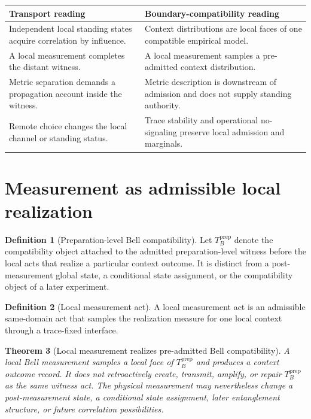\documentclass[11pt]{article}
\newtheorem{theorem}{Theorem}[section]
\theoremstyle{definition}
\newtheorem{definition}[theorem]{Definition}
\newcommand{\TBprep}{T_{B}^{\mathrm{prep}}}
\begin{document}
\begin{center}
\footnotesize
\begin{tabularx}{0.95\textwidth}{Y Y}
\toprule
\textbf{Transport reading} & \textbf{Boundary-compatibility reading}\\
\midrule
Independent local standing states acquire correlation by influence. & Context distributions are local faces of one compatible empirical model.\\
A local measurement completes the distant witness. & A local measurement samples a pre-admitted context distribution.\\
Metric separation demands a propagation account inside the witness. & Metric description is downstream of admission and does not supply standing authority.\\
Remote choice changes the local channel or standing status. & Trace stability and operational no-signaling preserve local admission and marginals.\\
\bottomrule
\end{tabularx}
\end{center}

\section{Measurement as admissible local realization}\label{sec:measurement}

\begin{definition}[Preparation-level Bell compatibility]\label{def:prepcompat}
Let $\TBprep$ denote the compatibility object attached to the admitted preparation-level witness before the local acts that realize a particular context outcome. It is distinct from a post-measurement global state, a conditional state assignment, or the compatibility object of a later experiment.
\end{definition}

\begin{definition}[Local measurement act]
A local measurement act is an admissible same-domain act that samples the realization measure for one local context through a trace-fixed interface.
\end{definition}

\begin{theorem}[Local measurement realizes pre-admitted Bell compatibility]\label{thm:localmeasurement}
A local Bell measurement samples a local face of $\TBprep$ and produces a context outcome record. It does not retroactively create, transmit, amplify, or repair $\TBprep$ as the same witness act. The physical measurement may nevertheless change a post-measurement state, a conditional state assignment, later entanglement structure, or future correlation possibilities.
\end{theorem}
\end{document}
